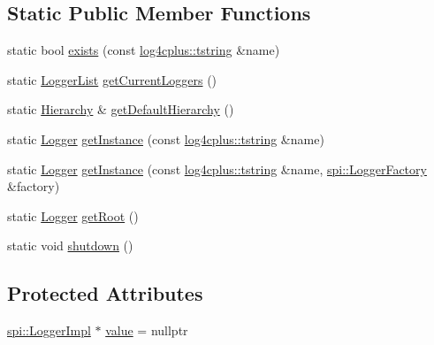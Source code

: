 \subsection*{Static Public Member Functions}
\begin{DoxyCompactItemize}
\item 
static bool \hyperlink{classlog4cplus_1_1Logger_a50368f23adbc8d162a85bb174a51c41e}{exists} (const \hyperlink{namespacelog4cplus_a3c9287f6ebcddc50355e29d71152117b}{log4cplus\-::tstring} \&name)
\item 
static \hyperlink{namespacelog4cplus_a9bad705b454c9c31bd84d97837fec22f}{Logger\-List} \hyperlink{classlog4cplus_1_1Logger_a648d3ab294aebdf7d7269168d2c4f6d2}{get\-Current\-Loggers} ()
\item 
static \hyperlink{classlog4cplus_1_1Hierarchy}{Hierarchy} \& \hyperlink{classlog4cplus_1_1Logger_a8d258d78a9a86f1f3a3241f43d015287}{get\-Default\-Hierarchy} ()
\item 
static \hyperlink{classlog4cplus_1_1Logger}{Logger} \hyperlink{classlog4cplus_1_1Logger_a7e6303f0e639d5354525a4779827f28e}{get\-Instance} (const \hyperlink{namespacelog4cplus_a3c9287f6ebcddc50355e29d71152117b}{log4cplus\-::tstring} \&name)
\item 
static \hyperlink{classlog4cplus_1_1Logger}{Logger} \hyperlink{classlog4cplus_1_1Logger_adaf129446ee7fd8ba79710dd6928f9f4}{get\-Instance} (const \hyperlink{namespacelog4cplus_a3c9287f6ebcddc50355e29d71152117b}{log4cplus\-::tstring} \&name, \hyperlink{classlog4cplus_1_1spi_1_1LoggerFactory}{spi\-::\-Logger\-Factory} \&factory)
\item 
static \hyperlink{classlog4cplus_1_1Logger}{Logger} \hyperlink{classlog4cplus_1_1Logger_a45ee754b1f04c20c2332129a10c54564}{get\-Root} ()
\item 
static void \hyperlink{classlog4cplus_1_1Logger_a9a288b93105766e0ad7bebbbf8c5ea2f}{shutdown} ()
\end{DoxyCompactItemize}
\subsection*{Protected Attributes}
\begin{DoxyCompactItemize}
\item 
\hyperlink{classlog4cplus_1_1spi_1_1LoggerImpl}{spi\-::\-Logger\-Impl} $\ast$ \hyperlink{classlog4cplus_1_1Logger_ad8290505934468f38e7c1cb388741e0c}{value} = nullptr
\end{DoxyCompactItemize}
